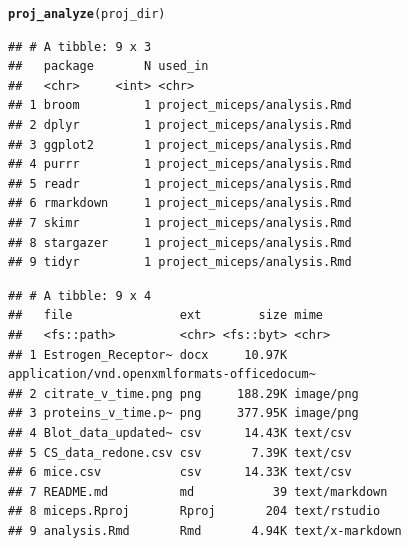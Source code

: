 \documentclass[APA,LATO1COL]{WileyNJD-v2}\usepackage[]{graphicx}\usepackage[]{color}
\makeatletter
\newcommand{\hlstd}[1]{\textcolor[rgb]{0.345,0.345,0.345}{#1}}%
\newcommand{\hlkwd}[1]{\textcolor[rgb]{0.737,0.353,0.396}{\textbf{#1}}}%
\newenvironment{kframe}{%
 \def\at@end@of@kframe{}%
 \ifinner\ifhmode%
  \def\at@end@of@kframe{\end{minipage}}%
  \begin{minipage}{\columnwidth}%
 \fi\fi%
 \def\FrameCommand##1{\hskip\@totalleftmargin \hskip-\fboxsep
 \colorbox{shadecolor}{##1}\hskip-\fboxsep
     \hskip-\linewidth \hskip-\@totalleftmargin \hskip\columnwidth}%
 \MakeFramed {\advance\hsize-\width
   \@totalleftmargin\z@ \linewidth\hsize
   \@setminipage}}%
 {\par\unskip\endMakeFramed%
 \at@end@of@kframe}
\newenvironment{knitrout}{}{} %
\makeatother
\begin{document}
\begin{knitrout}
\color{fgcolor}\begin{kframe}
\begin{alltt}
\hlkwd{proj_analyze}\hlstd{(proj_dir)}
\end{alltt}


{\ttfamily\noindent\itshape\color{messagecolor}{\#\# -- Analysis of reproducibility for project\_miceps ----------------------------------------- fertile 0.0.0.9027 --}}

{\ttfamily\noindent\itshape\color{messagecolor}{\#\# --\ \  Packages referenced in source code --------------------------------------------------- fertile 0.0.0.9027 --}}\begin{verbatim}
## # A tibble: 9 x 3
##   package       N used_in                    
##   <chr>     <int> <chr>                      
## 1 broom         1 project_miceps/analysis.Rmd
## 2 dplyr         1 project_miceps/analysis.Rmd
## 3 ggplot2       1 project_miceps/analysis.Rmd
## 4 purrr         1 project_miceps/analysis.Rmd
## 5 readr         1 project_miceps/analysis.Rmd
## 6 rmarkdown     1 project_miceps/analysis.Rmd
## 7 skimr         1 project_miceps/analysis.Rmd
## 8 stargazer     1 project_miceps/analysis.Rmd
## 9 tidyr         1 project_miceps/analysis.Rmd
\end{verbatim}


{\ttfamily\noindent\itshape\color{messagecolor}{\#\# --\ \  Files present in directory ----------------------------------------------------------- fertile 0.0.0.9027 --}}\begin{verbatim}
## # A tibble: 9 x 4
##   file               ext        size mime                                       
##   <fs::path>         <chr> <fs::byt> <chr>                                      
## 1 Estrogen_Receptor~ docx     10.97K application/vnd.openxmlformats-officedocum~
## 2 citrate_v_time.png png     188.29K image/png                                  
## 3 proteins_v_time.p~ png     377.95K image/png                                  
## 4 Blot_data_updated~ csv      14.43K text/csv                                   
## 5 CS_data_redone.csv csv       7.39K text/csv                                   
## 6 mice.csv           csv      14.33K text/csv                                   
## 7 README.md          md           39 text/markdown                              
## 8 miceps.Rproj       Rproj       204 text/rstudio                               
## 9 analysis.Rmd       Rmd       4.94K text/x-markdown
\end{verbatim}



\end{kframe}
\end{knitrout}
\end{document}
